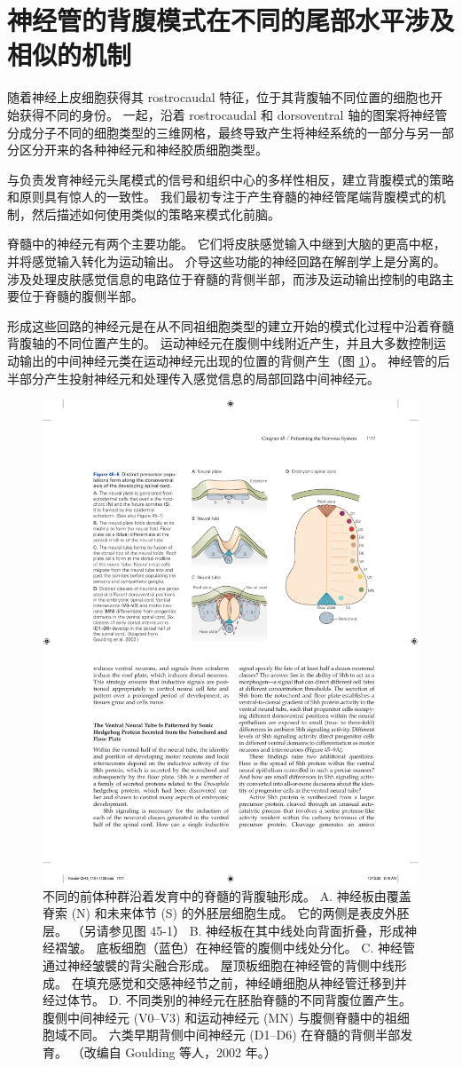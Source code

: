\section{神经管的背腹模式在不同的尾部水平涉及相似的机制}
随着神经上皮细胞获得其 rostrocaudal 特征，位于其背腹轴不同位置的细胞也开始获得不同的身份。 一起，沿着 rostrocaudal 和 dorsoventral 轴的图案将神经管分成分子不同的细胞类型的三维网格，最终导致产生将神经系统的一部分与另一部分区分开来的各种神经元和神经胶质细胞类型。

与负责发育神经元头尾模式的信号和组织中心的多样性相反，建立背腹模式的策略和原则具有惊人的一致性。 我们最初专注于产生脊髓的神经管尾端背腹模式的机制，然后描述如何使用类似的策略来模式化前脑。

脊髓中的神经元有两个主要功能。 它们将皮肤感觉输入中继到大脑的更高中枢，并将感觉输入转化为运动输出。 介导这些功能的神经回路在解剖学上是分离的。 涉及处理皮肤感觉信息的电路位于脊髓的背侧半部，而涉及运动输出控制的电路主要位于脊髓的腹侧半部。

形成这些回路的神经元是在从不同祖细胞类型的建立开始的模式化过程中沿着脊髓背腹轴的不同位置产生的。 运动神经元在腹侧中线附近产生，并且大多数控制运动输出的中间神经元类在运动神经元出现的位置的背侧产生（图 \ref{fig:45_8}）。 
神经管的后半部分产生投射神经元和处理传入感觉信息的局部回路中间神经元。

\begin{figure}[htbp]
	\centering
	\includegraphics[width=0.7\linewidth]{chap45/fig_45_8}
	\caption{不同的前体种群沿着发育中的脊髓的背腹轴形成。 A. 神经板由覆盖脊索 (N) 和未来体节 (S) 的外胚层细胞生成。 它的两侧是表皮外胚层。 （另请参见图 45-1） B. 神经板在其中线处向背面折叠，形成神经褶皱。 底板细胞（蓝色）在神经管的腹侧中线处分化。 C. 神经管通过神经皱襞的背尖融合形成。 屋顶板细胞在神经管的背侧中线形成。 在填充感觉和交感神经节之前，神经嵴细胞从神经管迁移到并经过体节。 D. 不同类别的神经元在胚胎脊髓的不同背腹位置产生。 腹侧中间神经元 (V0–V3) 和运动神经元 (MN) 与腹侧脊髓中的祖细胞域不同。 六类早期背侧中间神经元 (D1–D6) 在脊髓的背侧半部发育。 （改编自 Goulding 等人，2002 年。）}
	\label{fig:45_8}
\end{figure}

